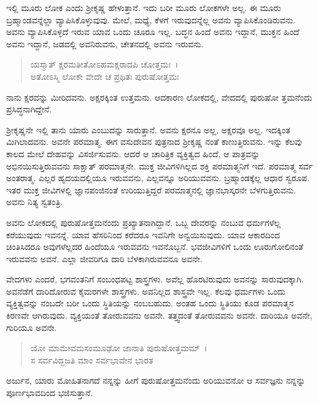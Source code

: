 ಇಲ್ಲಿ ಮೂರು ಲೋಕ ಎಂದು ಶ‍್ರೀಕೃಷ್ಣ ಹೇಳುತ್ತಾನೆ. ಇದು ಬರೀ ಮೂರು ಲೋಕಗಳೇ ಅಲ್ಲ. ಈ ಮೂರು ಬ್ರಹ್ಮಾಂಡವನ್ನೆಲ್ಲಾ ವ್ಯಾಪಿಸಿಕೊಳ್ಳುವುವು. ಮೇಲೆ, ಮಧ್ಯೆ, ಕೆಳಗೆ ಇರುವುದನ್ನೆಲ್ಲ ಅವನು ವ್ಯಾಪಿಸಿಕೊಂಡಿರುವನು. ಅವನು ವ್ಯಾಪಿಸಿಕೊಳ್ಳದೆ ಇರುವ ಯಾವ ಒಂದು ಚೂರೂ ಇಲ್ಲ. ಬದ್ಧನ ಹಿಂದೆ ಅವನು ಇದ್ದಾನೆ, ಮುಕ್ತನ ಹಿಂದೆ ಅವನು ಇದ್ದಾನೆ, ಜಡದಲ್ಲಿ ಅವನಿರುವನು, ಚೇತನದಲ್ಲಿ ಅವನು ಇರುವನು.

\begin{verse}
ಯಸ್ಮಾತ್ ಕ್ಷರಮತೀತೋಽಹಮಕ್ಷರಾದಪಿ ಚೋತ್ತಮಃ~।\\ಅತೋಽಸ್ಮಿ ಲೋಕೇ ವೇದೇ ಚ ಪ್ರಥಿತಃ ಪುರುಷೋತ್ತಮಃ 
\end{verse}

{\small ನಾನು ಕ್ಷರವನ್ನು ಮೀರಿದವನು. ಅಕ್ಷರಕ್ಕಿಂತ ಉತ್ತಮನು. ಆದಕಾರಣ ಲೋಕದಲ್ಲಿ, ವೇದದಲ್ಲಿ ಪುರುಷೋ ತ್ತಮನೆಂದು ಪ್ರಸಿದ್ಧನಾಗಿದ್ದೇನೆ.}

ಶ‍್ರೀಕೃಷ್ಣನೇ ಇಲ್ಲಿ ತಾನು ಯಾರು ಎಂಬುದನ್ನು ಸಾರುತ್ತಾನೆ. ಅವನು ಕ್ಷರನೂ ಅಲ್ಲ, ಅಕ್ಷರವೂ ಅಲ್ಲ. ಇದಕ್ಕಿಂತ ಮಿಗಿಲಾದವನು. ಅವನೇ ಪರಮಾತ್ಮ. ಈಗ ವಸುದೇವನ ಪುತ್ರನಾದ ಶ‍್ರೀಕೃಷ್ಣ ನಂತೆ ಕಾಣುತ್ತಿರುವನು. ಇನ್ನು ಕೆಲವು ಕಾಲದ ಮೇಲೆ ದೇಹವನ್ನು ವಿಸರ್ಜಿಸುವನು. ಆದರೆ ಆ ಚಾರಿತ್ರಿಕ ವ್ಯಕ್ತಿತ್ವದ ಹಿಂದೆ, ಆ ಪಾತ್ರವನ್ನು ಅಭಿನಯಿಸುತ್ತಿರುವವನು ಸಾಕ್ಷಾತ್ ಪರಮಾತ್ಮನೇ. ಮುಕ್ತ ಜೀವಿಗಳಿಗಿಲ್ಲದ ಶಕ್ತಿ ಪರಮಾತ್ಮನಿಗೆ ಇದೆ. ಪರಮಾತ್ಮ ಸರ್ವ ಅಂತರಾತ್ಮ. ಎಲ್ಲರ ಹೃದಯದಲ್ಲಿಯೂ ಇರುವವನು, ಎಲ್ಲವನ್ನೂ ಅರಿಯುವವನು. ಬ್ರಹ್ಮಾಂಡಕ್ಕೆಲ್ಲ ಆಧಾರ ಸ್ವರೂಪ. ಇತರ ಮುಕ್ತ ಜೀವಿಗಳಲ್ಲಿ ಜ್ಞಾನಪಂಜಿನಂತೆ ಉರಿಯುತ್ತಿದ್ದರೆ ಪರಮಾತ್ಮನಲ್ಲಿ ಜ್ಞಾನಭಾಸ್ಕರನೇ ಬೆಳಗುತ್ತಿರುವನು. ಅವನು ನಿತ್ಯ ಸ್ವತಂತ್ರಿ.

ಅವನು ಲೋಕದಲ್ಲಿ ಪುರುಷೋತ್ತಮನೆಂದು ಪ್ರಖ್ಯಾತನಾಗಿದ್ದಾನೆ. ಒಬ್ಬ ದೇವರನ್ನು ನಂಬುವ ಧರ್ಮಗಳೆಲ್ಲ ಕರೆಯುವುದು ಇವನನ್ನೆ. ಯಾವ ಹೆಸರಿನಿಂದ ಕರೆದರೂ ಇವನಿಗೇ ಅನ್ವಯಿಸುವುದು. ಯಾವ ಆಕಾರದಿಂದ ಚಿಂತಿಸಿದರೂ ಅವುಗಳೆಲ್ಲದರ ಹಿಂದೆಯೂ ಇರುವವನು ಇವನೊಬ್ಬನೆ. ಭವಜೀವಿಗಳಿಗೆ ಒಂದು ಊರುಗೋಲಿನಂತೆ ಇರುವವನು ಅವನೆ. ಎಲ್ಲಾ ಜೀವರಿಗೂ ದಾರಿ ಬೆಳಕಾಗಿರುವವನೂ ಅವನೇ.

ವೇದಗಳು ಎಂದರೆ, ಭಗವಂತನಿಗೆ ಸಂಬಂಧಪಟ್ಟ ಶಾಸ್ತ್ರಗಳು. ಅವೆಲ್ಲ ಹೊರಟಿರುವುದು ಅವನನ್ನು ಸಾರುವುದಕ್ಕಾಗಿ. ಅವನೆಡೆಗೆ ದಾರಿದೋರುವ ಕೈಮರಗಳೇ ಶಾಸ್ತ್ರಗಳು. ಅವನಿಲ್ಲದ ಶಾಸ್ತ್ರವೇ ಇಲ್ಲ. ಕೆಲವು ಧರ್ಮಗಳು ಒಂದು ವ್ಯಕ್ತಿತ್ವವನ್ನು ನಂಬದೇ ಬರೀ ಒಂದು ಸ್ಥಿತಿಯನ್ನು ನಂಬಬಹುದು. ಅಂತಹ ಒಂದು ಸ್ಥಿತಿಯು ಕೂಡ ಪರಮಾತ್ಮನ ಕಿರಣವೇ ಆಗಿರುವುದು. ವ್ಯಕ್ತಿಯಂತೆ ತೋರುವವನು ಅವನೇ. ತತ್ತ್ವದಂತೆ ತೋರುವವನು ಅವನೇ. ದಾರಿಯೂ ಅವನೇ, ಗುರಿಯೂ ಅವನೇ.

\begin{verse}
ಯೋ ಮಾಮೇವಮಸಂಮೂಢೋ ಜಾನಾತಿ ಪುರುಷೋತ್ತಮಮ್~।\\ಸ ಸರ್ವವಿದ್ಭಜತಿ ಮಾಂ ಸರ್ವಭಾವೇನ ಭಾರತ 
\end{verse}

{\small ಅರ್ಜುನ, ಯಾರು ಮೋಹಿತನಾಗದೆ ನನ್ನನ್ನು ಹೀಗೆ ಪುರುಷೋತ್ತಮನೆಂದು ಅರಿಯುವನೋ ಆ ಸರ್ವಜ್ಞನು ನನ್ನನ್ನು ಪೂರ್ಣಭಾವದಿಂದ ಭಜಿಸುತ್ತಾನೆ.}

